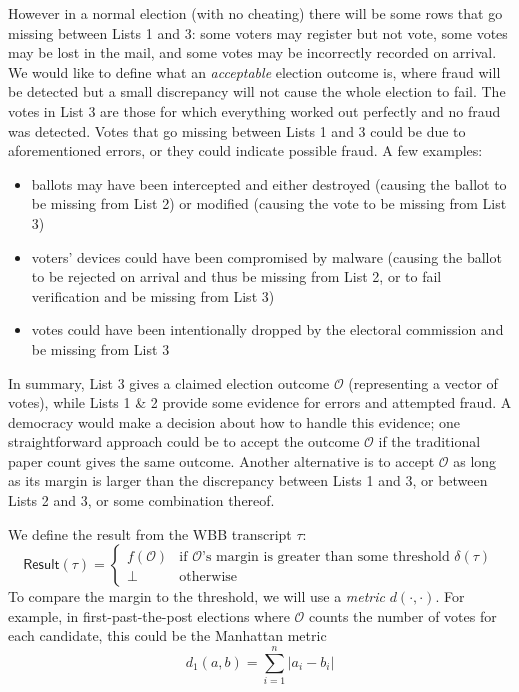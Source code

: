 \documentclass[12pt,a4paper]{article}
\theoremstyle{definition}
\begin{document}
However in a normal election (with no cheating) there will be some rows that go missing between Lists 1 and 3: some voters may register but not vote, some votes may be lost in the mail, and some votes may be incorrectly recorded on arrival. We would like to define what an \textit{acceptable} election outcome is, where fraud will be detected but a small discrepancy will not cause the whole election to fail. The votes in List 3 are those for which everything worked out perfectly and no fraud was detected. Votes that go missing between Lists 1 and 3 could be due to aforementioned errors, or they could indicate possible fraud. A few examples:
\begin{itemize}
    \item ballots may have been intercepted and either destroyed (causing the ballot to be missing from List 2) or modified (causing the vote to be missing from List 3)
    \item voters' devices could have been compromised by malware (causing the ballot to be rejected on arrival and thus be missing from List 2, or to fail verification and be missing from List 3)
    \item votes could have been intentionally dropped by the electoral commission and be missing from List 3
\end{itemize}

In summary, List 3 gives a claimed election outcome $\mathcal{O}$ (representing a vector of votes), while Lists 1 \& 2 provide some evidence for errors and attempted fraud. A democracy would make a decision about how to handle this evidence; one straightforward approach could be to accept the outcome $\mathcal{O}$ if the traditional paper count gives the same outcome. Another alternative is to accept $\mathcal{O}$ as long as its margin is larger than the discrepancy between Lists 1 and 3, or between Lists 2 and 3, or some combination thereof.

We define the result from the WBB transcript $\tau$:
$$\mathsf{Result}(\tau)=
\begin{cases}
    f(\mathcal{O})  &   \text{if }\mathcal{O}\text{'s margin is greater than some threshold } \delta(\tau)\\
    \bot            &   \text{otherwise}
\end{cases}$$
To compare the margin to the threshold, we will use a \textit{metric} $d(\cdot,\cdot)$. For example, in first-past-the-post elections where $\mathcal{O}$ counts the number of votes for each candidate, this could be the Manhattan metric
$$d_1(a, b)=\sum_{i=1}^n |a_i-b_i|$$
\end{document}
